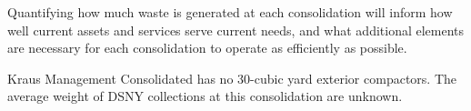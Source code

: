 
    Quantifying how much waste is generated at each consolidation will inform how well current assets and services serve current needs, and what additional elements are necessary for each consolidation to operate as efficiently as possible.
    
    Kraus Management Consolidated has no 30-cubic yard exterior compactors. The average weight of DSNY collections at this consolidation are unknown.